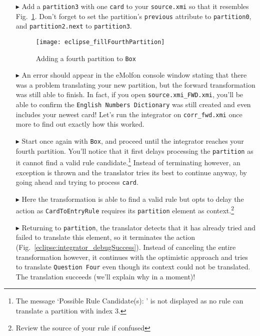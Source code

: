 \begin{itemize}

\item[$\blacktriangleright$] Add a \texttt{partition3} with one \texttt{card} to your \texttt{source.xmi} so that it resembles
Fig.~\ref{eclipse:fourthPartitionStart}. Don't forget to set the partition's \texttt{previous} attribute to \texttt{partition0}, and \texttt{partition2.next} to
\texttt{partition3}.

\begin{figure}[htbp]
\begin{center}
  \texttt{[image: eclipse\_fillFourthPartition]}
  \caption{Adding a fourth partition to \texttt{Box}}
  \label{eclipse:fourthPartitionStart}
\end{center}
\end{figure}

\item[$\blacktriangleright$] An error should appear in the eMolfon console window stating that there was a problem translating your new partition, but the
forward transformation was still able to finish. In fact, if you open \texttt{source\-.xmi\_FWD\-.xmi}, you'll be able to confirm the \texttt{Eng\-lish
Numb\-ers Dict\-ion\-ary} was still created and even includes your newest card! Let's run the integrator on \texttt{corr\_fwd.xmi} once more to find out
exactly how this worked.

\item[$\blacktriangleright$] Start once again with \texttt{Box}, and proceed until the integrator reaches your fourth partition. You'll notice that it
first delays processing the \texttt{partition} as it cannot find a valid rule candidate.\footnote{The message `Possible Rule Candidate(s): ' is not displayed
as no rule can translate a partition with index 3.} Instead of terminating however, an exception is thrown and the translator tries its best to continue anyway,
by going ahead and trying to process \texttt{card}.

\item[$\blacktriangleright$] Here the transformation is able to find a valid rule but opts to delay the action as \texttt{CardToEntryRule} requires its
\texttt{partition} element as context.\footnote{Review the source of your rule if confused}

\item[$\blacktriangleright$] Returning to \texttt{partition}, the translator detects that it has already tried and failed to translate this element, so it
terminates the action (Fig.~\ref{eclipse:integrator_debugSuccess}). Instead of canceling the entire transformation however, it continues with the optimistic
approach and tries to translate \texttt{Question Four} even though its context could not be translated. The translation succeeds (we'll explain why in a
moment)!


\end{itemize}

